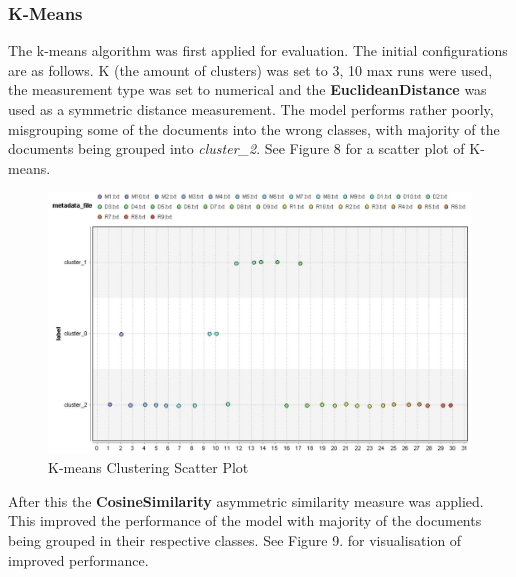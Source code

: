 \subsubsection*{K-Means}
The k-means algorithm was first applied for evaluation. The initial configurations are as follows. K (the amount of clusters) was set to 3, 10 max runs were used, the measurement type was set to numerical and the \textbf{EuclideanDistance} was used as a symmetric distance measurement. The model performs rather poorly, misgrouping some of the documents into the wrong classes, with majority of the documents being grouped into \textit{cluster\_2}. See Figure 8 for a scatter plot of K-means.

\begin{figure}[ht]
	\begin{center}
		\advance\leftskip-3cm
		\advance\rightskip-3cm
		\includegraphics[keepaspectratio=true,scale=0.6]{__resources/kmeans1.JPG}
		\caption{K-means Clustering Scatter Plot}
		\label{stop}
	\end{center}
\end{figure} 

After this the \textbf{CosineSimilarity} asymmetric similarity measure was applied. This improved the performance of the model with majority of the documents being grouped in their respective classes. See Figure 9. for visualisation of improved performance.

